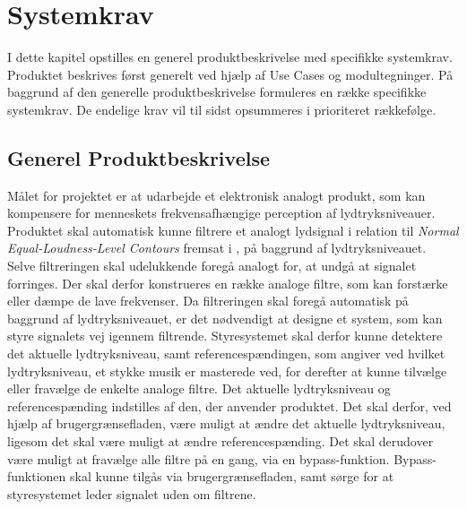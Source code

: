 \chapter{Systemkrav}
\label{Systemkrav}
%
I dette kapitel opstilles en generel produktbeskrivelse med specifikke systemkrav. Produktet beskrives først generelt ved hjælp af Use Cases og modultegninger. På baggrund af den generelle produktbeskrivelse formuleres en række specifikke systemkrav. De endelige krav vil til sidst opsummeres i prioriteret rækkefølge. 

\section{Generel Produktbeskrivelse}
\label{Generel_Produktbeskrivelse}
%
Målet for projektet er at udarbejde et elektronisk analogt produkt, som kan kompensere for menneskets frekvensafhængige perception af lydtryksniveauer. Produktet skal automatisk kunne filtrere et analogt lydsignal i relation til \textit{Normal Equal-Loudness-Level Contours} fremsat i \textcite{STD:ISO226}, på baggrund af lydtryksniveauet.\\
Selve filtreringen skal udelukkende foregå analogt for, at undgå at signalet forringes. Der skal derfor konstrueres en række analoge filtre, som kan forstærke eller dæmpe de lave frekvenser. Da filtreringen skal foregå automatisk på baggrund af lydtryksniveauet, er det nødvendigt at designe et system, som kan styre signalets vej igennem filtrende. Styresystemet skal derfor kunne detektere det aktuelle lydtryksniveau, samt referencespændingen, som angiver ved hvilket lydtryksniveau, et stykke musik er masterede ved, for derefter at kunne tilvælge eller fravælge de enkelte analoge filtre. Det aktuelle lydtryksniveau og referencespænding indstilles af den, der anvender produktet. Det skal derfor, ved hjælp af brugergrænsefladen, være muligt at ændre det aktuelle lydtryksniveau, ligesom det skal være muligt at ændre referencespænding. Det skal derudover være muligt at fravælge alle filtre på en gang, via en bypass-funktion. Bypass-funktionen skal kunne tilgås via brugergrænsefladen, samt sørge for at styresystemet leder signalet uden om filtrene.
   
